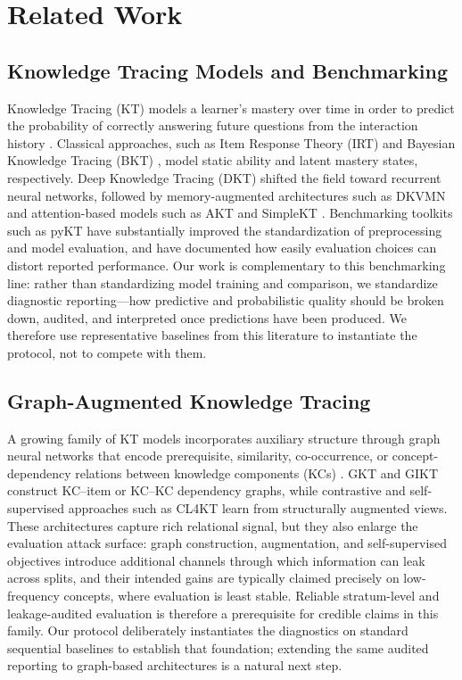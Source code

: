 \section{Related Work}
\label{sec:related}

\subsection{Knowledge Tracing Models and Benchmarking}
Knowledge Tracing (KT) models a learner's mastery over time in order to predict the probability of correctly answering future questions from the interaction history \citep{abdelrahman2023knowledge}. Classical approaches, such as Item Response Theory (IRT) \citep{rasch1960probabilistic,embretson2000item} and Bayesian Knowledge Tracing (BKT) \citep{corbett1994knowledge}, model static ability and latent mastery states, respectively. Deep Knowledge Tracing (DKT) \citep{piech2015deep} shifted the field toward recurrent neural networks, followed by memory-augmented architectures such as DKVMN \citep{zhang2017dynamic} and attention-based models such as AKT \citep{ghosh2020context} and SimpleKT \citep{liu2023simplekt}. Benchmarking toolkits such as pyKT \citep{liu2022pykt} have substantially improved the standardization of preprocessing and model evaluation, and have documented how easily evaluation choices can distort reported performance. Our work is complementary to this benchmarking line: rather than standardizing model training and comparison, we standardize diagnostic reporting---how predictive and probabilistic quality should be broken down, audited, and interpreted once predictions have been produced. We therefore use representative baselines from this literature to instantiate the protocol, not to compete with them.

\subsection{Graph-Augmented Knowledge Tracing}
A growing family of KT models incorporates auxiliary structure through graph neural networks that encode prerequisite, similarity, co-occurrence, or concept-dependency relations between knowledge components (KCs) \citep{abdelrahman2023knowledge}. GKT \citep{nakagawa2019graph} and GIKT \citep{yang2021gikt} construct KC--item or KC--KC dependency graphs, while contrastive and self-supervised approaches such as CL4KT \citep{lee2022cl4kt} learn from structurally augmented views. These architectures capture rich relational signal, but they also enlarge the evaluation attack surface: graph construction, augmentation, and self-supervised objectives introduce additional channels through which information can leak across splits, and their intended gains are typically claimed precisely on low-frequency concepts, where evaluation is least stable. Reliable stratum-level and leakage-audited evaluation is therefore a prerequisite for credible claims in this family. Our protocol deliberately instantiates the diagnostics on standard sequential baselines to establish that foundation; extending the same audited reporting to graph-based architectures is a natural next step.

